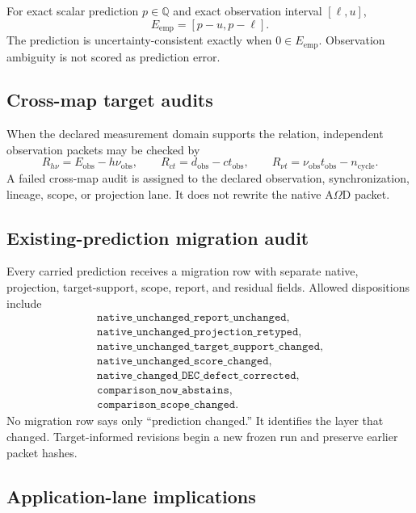 For exact scalar prediction $p\in\mathbb Q$ and exact observation interval $[\ell,u]$,
\[
E_{\mathrm{emp}}=[p-u,p-\ell].
\]
The prediction is uncertainty-consistent exactly when $0\in E_{\mathrm{emp}}$.  Observation ambiguity is not scored as prediction error.

\subsection{Cross-map target audits}

When the declared measurement domain supports the relation, independent observation packets may be checked by
\[
R_{h\nu}=E_{\mathrm{obs}}-h\nu_{\mathrm{obs}},
\qquad
R_{ct}=d_{\mathrm{obs}}-ct_{\mathrm{obs}},
\qquad
R_{\nu t}=\nu_{\mathrm{obs}}t_{\mathrm{obs}}-n_{\mathrm{cycle}}.
\]
A failed cross-map audit is assigned to the declared observation, synchronization, lineage, scope, or projection lane.  It does not rewrite the native A$\Omega$D packet.

\subsection{Existing-prediction migration audit}

Every carried prediction receives a migration row with separate native, projection, target-support, scope, report, and residual fields.  Allowed dispositions include
\[
\begin{gathered}
\texttt{native\_unchanged\_report\_unchanged},\\
\texttt{native\_unchanged\_projection\_retyped},\\
\texttt{native\_unchanged\_target\_support\_changed},\\
\texttt{native\_unchanged\_score\_changed},\\
\texttt{native\_changed\_DEC\_defect\_corrected},\\
\texttt{comparison\_now\_abstains},\\
\texttt{comparison\_scope\_changed}.
\end{gathered}
\]
No migration row says only ``prediction changed.''  It identifies the layer that changed.  Target-informed revisions begin a new frozen run and preserve earlier packet hashes.

\subsection{Application-lane implications}

